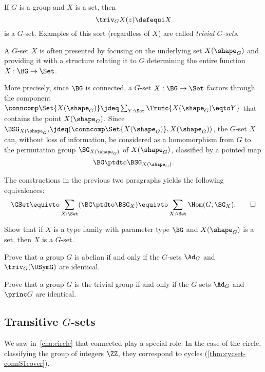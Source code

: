 \begin{example}\label{def:trivGset}
  If $G$ is a group and $X$ is a set, then
  \[\triv_G X(z)\defequi X\]
  is a $G$-set.
  Examples of this sort (regardless of $X$) are called \emph{trivial $G$-sets}.
\end{example}

\begin{remark}
  \label{remark:GsetsareGsets}
  A $G$-set $X$ is often presented by focusing on the underlying set $X(\shape_G)$
  and providing it with a structure relating it to $G$ determining
  the entire function $X : \BG\to\Set$.

  More precisely, since $\BG$ is connected, a $G$-set $X : \BG\to\Set$ factors
  through the component
  $\conncomp \Set {X(\shape_G)} \jdeq \sum_{Y:\Set}\Trunc{X(\shape_G) \eqto Y}$
  that contains the point $X(\shape_G)$.
  Since $\BSG_{X(\shape_G)}\jdeq(\conncomp \Set {X(\shape_G)},X(\shape_G))$,
  the $G$-set $X$ can,
  without loss of information, be considered as a homomorphism from $G$ to
  the permutation group $\SG_{X(\shape_G)}$ of $X(\shape_G)$,
  classified by a pointed map
  \[
    \BG\ptdto\BSG_{X(\shape_G)}.
  \]

  The constructions in the previous two paragraphs yields the following equivalences:
  \[
    \GSet \equivto \sum_{X:\Set} (\BG \ptdto \BSG_X)
     \equivto \sum_{X:\Set}\Hom(G,\SG_X).\qedhere
   \]
\end{remark}

\begin{xca}
Show that if $X$ is a type family with parameter type $\BG$ and $X(\shape_G)$ is a set,
then $X$ is a $G$-set.
\end{xca}

\begin{xca}\label{xca:Ad-triv-abelian}
  Prove that a group $G$ is abelian if and only if the $G$-sets $\Ad_G$ and
  $\triv_G(\USymG)$ are identical.
\end{xca}

\begin{xca}\label{xca:Ad-princ-trivial}
  Prove that a group $G$ is the trivial group if and only if the $G$-sets $\Ad_G$ and
  $\princ G$ are identical.
\end{xca}

\subsection{Transitive $G$-sets}
\label{sec:transitiveGsets}
We saw in~\cref{cha:circle} that connected \coverings play a special role:
In the case of the circle, classifying the group of integers $\ZZ$,
they correspond to cycles (\cref{thm:cycset-connS1cover}).

